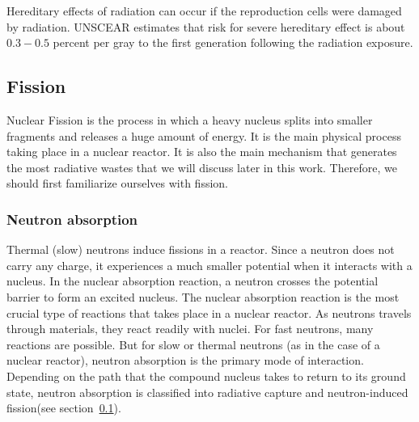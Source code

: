 \documentclass[nofootinbib,preprint,aip,pra]{revtex4-1}
\newcommand{\red}[1]{\textcolor{red}{\bf #1}}
\begin{document}
        Hereditary effects of radiation can occur if the reproduction cells were damaged by radiation.
        UNSCEAR estimates that risk for severe hereditary effect is about $0.3-0.5$ percent per gray to
        the first generation following the radiation exposure.\cite{u16, unscear12}


    \subsection{Fission}
    \label{sec:fission}
        Nuclear Fission is the process in which a heavy nucleus splits into smaller fragments and releases
        a huge amount of energy. It is the main physical process taking place in a nuclear reactor. It is
        also the main mechanism that generates the most radiative wastes that we will discuss later
        in this work. Therefore, we should first familiarize ourselves with fission.
    \subsubsection{Neutron absorption}
    \label{sec:capture}
    Thermal (slow) neutrons induce fissions in a reactor.
    Since a neutron does not carry any charge, it experiences a much smaller potential when it interacts
    with a nucleus. In the nuclear absorption reaction, a neutron crosses the potential barrier to form
    an excited nucleus.
    The nuclear absorption reaction is the most crucial type of reactions that takes place in
    a nuclear reactor. As neutrons travels through materials, they react readily with nuclei.
    For fast neutrons, many reactions are possible. But for slow or thermal neutrons (as in the
    case of a nuclear reactor), neutron absorption is the primary mode of interaction.
    Depending on the path that the compound nucleus takes to return to its ground
    state, neutron absorption is classified into radiative capture and neutron-induced
    fission(see section~\ref{sec:fission}).
    
\end{document}

